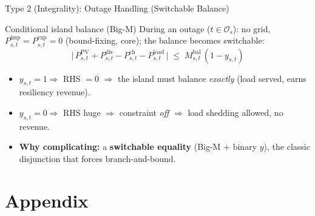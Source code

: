 \documentclass[aspectratio=169]{beamer}
\begin{document}
\begin{frame}{Type 2 (Integrality): Outage Handling (Switchable Balance)}
\begin{block}{Conditional island balance (Big-M)}
During an outage ($t\in\mathcal{O}_s$): no grid, $P^{\text{imp}}_{s,t}=P^{\text{exp}}_{s,t}=0$
(bound-fixing, core); the balance becomes switchable:
\[
\big|\,P^{\text{PV}}_{s,t} + P^{\text{dis}}_{s,t} - P^{\text{ch}}_{s,t} - P^{\text{load}}_{s,t}\,\big|
\;\le\; M^{\text{bal}}_{s,t}\,(1 - y_{s,t})
\]
\end{block}
\begin{itemize}\footnotesize
    \item $y_{s,t}=1 \Rightarrow$ RHS $=0$ $\Rightarrow$ the island must balance
          \emph{exactly} (load served, earns resiliency revenue).
    \item $y_{s,t}=0 \Rightarrow$ RHS huge $\Rightarrow$ constraint \emph{off}
          $\Rightarrow$ load shedding allowed, no revenue.
    \item \textbf{Why complicating:} a \textbf{switchable equality} (Big-M $+$ binary
          $y$), the classic disjunction that forces branch-and-bound.
\end{itemize}
\end{frame}


\section{Appendix}
\end{document}
